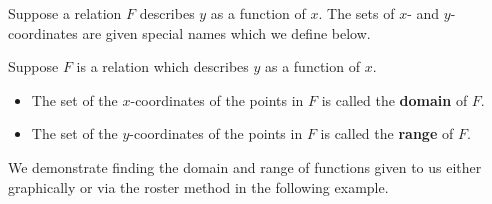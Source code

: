 \medskip

Suppose a relation $F$ describes $y$ as a function of $x$.  The sets of $x$- and $y$-coordinates are given special names which we define below.

\medskip

\colorbox{ResultColor}{\bbm


\begin{defn}

\label{domainrangedefn} 

Suppose $F$ is a relation which describes $y$ as a function of $x$.

\begin{itemize}

\item  The set of the $x$-coordinates of the points in $F$ is called the \textbf{domain} of $F$.

\item  The set of the $y$-coordinates of the points in $F$ is called the \textbf{range} of $F$.


\end{itemize}

\end{defn}

\ebm}

\medskip

We demonstrate finding the domain and range of functions given to us either graphically or via the roster method in the following example.

